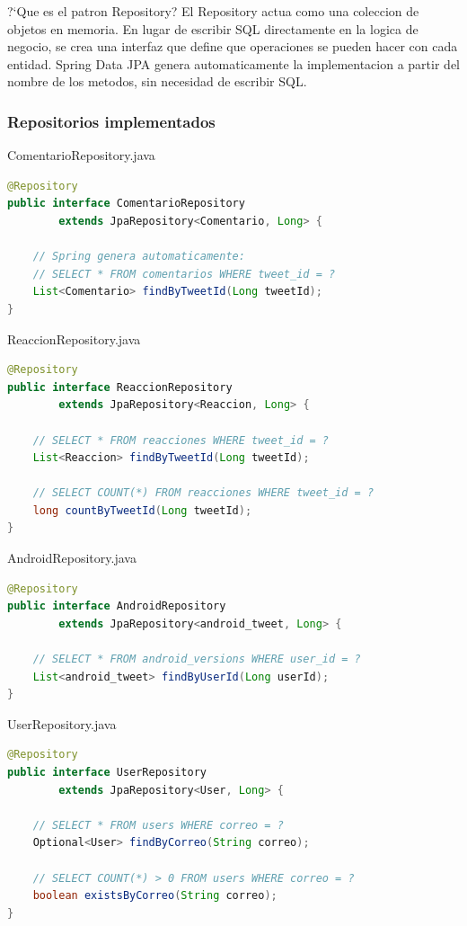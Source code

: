 \documentclass[12pt,a4paper]{article}
\begin{document}
\begin{patternbox}{?`Que es el patron Repository?}
El Repository actua como una coleccion de objetos en memoria. En lugar
de escribir SQL directamente en la logica de negocio, se crea una
interfaz que define que operaciones se pueden hacer con cada entidad.
Spring Data JPA genera automaticamente la implementacion a partir
del nombre de los metodos, sin necesidad de escribir SQL.
\end{patternbox}

\subsubsection{Repositorios implementados}

\begin{filebox}{ComentarioRepository.java}
\begin{lstlisting}[language=Java]
@Repository
public interface ComentarioRepository
        extends JpaRepository<Comentario, Long> {

    // Spring genera automaticamente:
    // SELECT * FROM comentarios WHERE tweet_id = ?
    List<Comentario> findByTweetId(Long tweetId);
}
\end{lstlisting}
\end{filebox}

\begin{filebox}{ReaccionRepository.java}
\begin{lstlisting}[language=Java]
@Repository
public interface ReaccionRepository
        extends JpaRepository<Reaccion, Long> {

    // SELECT * FROM reacciones WHERE tweet_id = ?
    List<Reaccion> findByTweetId(Long tweetId);

    // SELECT COUNT(*) FROM reacciones WHERE tweet_id = ?
    long countByTweetId(Long tweetId);
}
\end{lstlisting}
\end{filebox}

\begin{filebox}{AndroidRepository.java}
\begin{lstlisting}[language=Java]
@Repository
public interface AndroidRepository
        extends JpaRepository<android_tweet, Long> {

    // SELECT * FROM android_versions WHERE user_id = ?
    List<android_tweet> findByUserId(Long userId);
}
\end{lstlisting}
\end{filebox}

\begin{filebox}{UserRepository.java}
\begin{lstlisting}[language=Java]
@Repository
public interface UserRepository
        extends JpaRepository<User, Long> {

    // SELECT * FROM users WHERE correo = ?
    Optional<User> findByCorreo(String correo);

    // SELECT COUNT(*) > 0 FROM users WHERE correo = ?
    boolean existsByCorreo(String correo);
}
\end{lstlisting}
\end{filebox}
\end{document}
